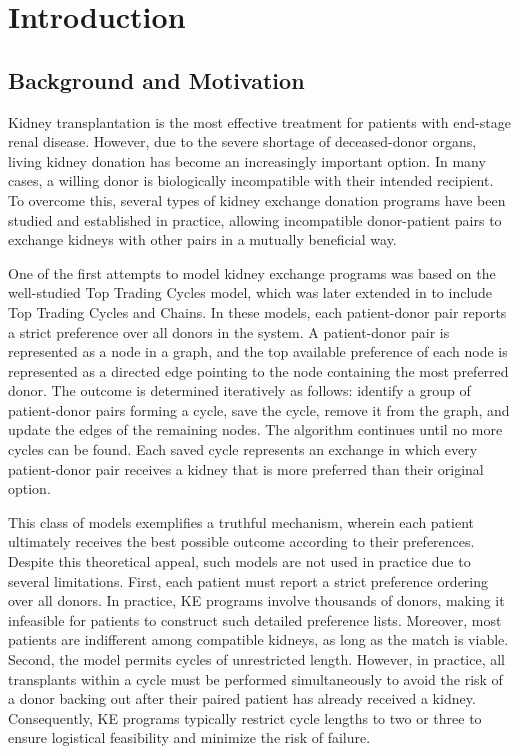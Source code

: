 \chapter{Introduction}
\label{cha:introduction}


\section{Background and Motivation}

Kidney transplantation is the most effective treatment for patients with end-stage renal disease. However, due to the severe shortage of deceased-donor organs, living kidney donation has become an increasingly important option. In many cases, a willing donor is biologically incompatible with their intended recipient. To overcome this, several types of kidney exchange donation programs have been studied and established in practice, allowing incompatible donor-patient pairs to exchange kidneys with other pairs in a mutually beneficial way.

One of the first attempts to model kidney exchange programs was based on the well-studied Top Trading Cycles model, which was later extended in \cite{roth2004kidney} to include Top Trading Cycles and Chains. In these models, each patient-donor pair reports a strict preference over all donors in the system. A patient-donor pair is represented as a node in a graph, and the top available preference of each node is represented as a directed edge pointing to the node containing the most preferred donor. The outcome is determined iteratively as follows: identify a group of patient-donor pairs forming a cycle, save the cycle, remove it from the graph, and update the edges of the remaining nodes. The algorithm continues until no more cycles can be found. Each saved cycle represents an exchange in which every patient-donor pair receives a kidney that is more preferred than their original option.

This class of models exemplifies a truthful mechanism, wherein each patient ultimately receives the best possible outcome according to their preferences. Despite this theoretical appeal, such models are not used in practice due to several limitations. First, each patient must report a strict preference ordering over all donors. In practice, \ac{KE} programs involve thousands of donors, making it infeasible for patients to construct such detailed preference lists. Moreover, most patients are indifferent among compatible kidneys, as long as the match is viable. Second, the model permits cycles of unrestricted length. However, in practice, all transplants within a cycle must be performed simultaneously to avoid the risk of a donor backing out after their paired patient has already received a kidney. Consequently, \ac{KE} programs typically restrict cycle lengths to two or three to ensure logistical feasibility and minimize the risk of failure.

